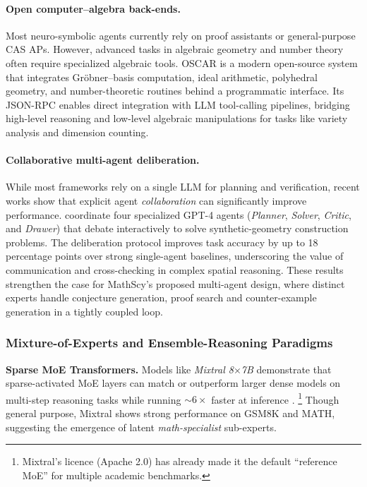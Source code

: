 \documentclass[acmsmall,anonymous]{acmart}
\begin{document}
\paragraph{Open computer–algebra back-ends.}
Most neuro-symbolic agents currently rely on proof assistants or general-purpose CAS APs. However, advanced tasks in algebraic geometry and number theory often require specialized algebraic tools.
\textsc{OSCAR} \cite{bosma2021oscar} is a modern open-source system that integrates Gröbner–basis computation, ideal arithmetic, polyhedral
geometry, and number-theoretic routines behind a programmatic interface.
Its JSON-RPC enables direct integration with LLM tool-calling pipelines, bridging high-level reasoning and low-level algebraic manipulations for tasks like variety analysis and dimension counting.

\paragraph{Collaborative multi-agent deliberation.}
While most frameworks rely on a single LLM for planning and verification, recent works show that explicit agent
\emph{collaboration} can significantly improve performance.
\citet{du2024collabgeo} coordinate four specialized GPT-4 agents
(\emph{Planner}, \emph{Solver}, \emph{Critic}, and \emph{Drawer}) that debate
interactively to solve synthetic-geometry construction problems.
The deliberation protocol improves task accuracy by up to
18\,percentage points over strong single-agent baselines, underscoring the
value of communication and cross-checking in complex spatial reasoning.
These results strengthen the case for MathScy’s proposed multi-agent design,
where distinct experts handle conjecture generation, proof search and
counter-example generation in a tightly coupled loop.

\subsubsection{Mixture-of-Experts and Ensemble-Reasoning Paradigms}
\label{sec:moe}

\textbf{Sparse MoE Transformers.}  
Models like \emph{Mixtral 8$\times$7B}
demonstrate that sparse-activated MoE layers can match or outperform larger dense models on multi-step reasoning tasks while running
$\sim\!6\times$ faster at inference
\citep{jiang2024mixtral}.%
\footnote{Mixtral’s licence (Apache 2.0) has already made it the default
“reference MoE” for multiple academic benchmarks.}
Though general purpose, Mixtral shows strong performance on GSM8K and MATH, suggesting the emergence of latent \emph{math-specialist} sub-experts.
\end{document}
